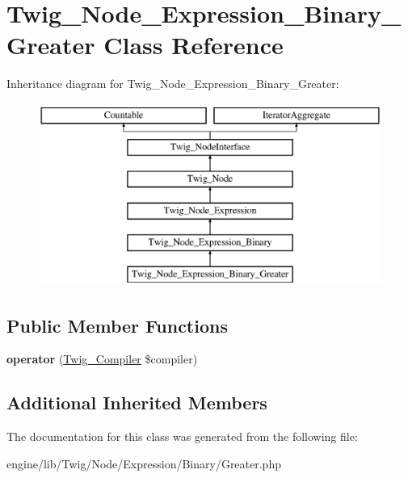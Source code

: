 \hypertarget{class_twig___node___expression___binary___greater}{}\section{Twig\+\_\+\+Node\+\_\+\+Expression\+\_\+\+Binary\+\_\+\+Greater Class Reference}
\label{class_twig___node___expression___binary___greater}
Inheritance diagram for Twig\+\_\+\+Node\+\_\+\+Expression\+\_\+\+Binary\+\_\+\+Greater\+:\begin{figure}[H]
\begin{center}
\leavevmode
\includegraphics[height=6.000000cm]{class_twig___node___expression___binary___greater}
\end{center}
\end{figure}
\subsection*{Public Member Functions}
\begin{DoxyCompactItemize}
\item 
\hypertarget{class_twig___node___expression___binary___greater_af77318ec88d5f8a508684970a150b670}{}{\bfseries operator} (\hyperlink{class_twig___compiler}{Twig\+\_\+\+Compiler} \$compiler)\label{class_twig___node___expression___binary___greater_af77318ec88d5f8a508684970a150b670}

\end{DoxyCompactItemize}
\subsection*{Additional Inherited Members}


The documentation for this class was generated from the following file\+:\begin{DoxyCompactItemize}
\item 
engine/lib/\+Twig/\+Node/\+Expression/\+Binary/Greater.\+php\end{DoxyCompactItemize}
